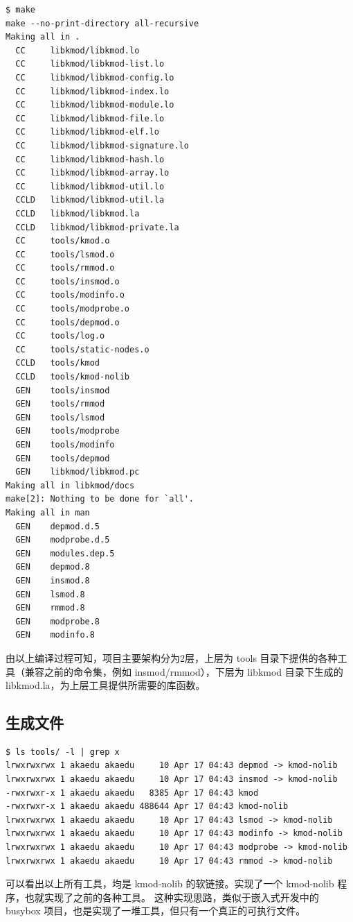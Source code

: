 {\begin{shaded}\begin{verbatim}
$ make
make --no-print-directory all-recursive
Making all in .
  CC     libkmod/libkmod.lo
  CC     libkmod/libkmod-list.lo
  CC     libkmod/libkmod-config.lo
  CC     libkmod/libkmod-index.lo
  CC     libkmod/libkmod-module.lo
  CC     libkmod/libkmod-file.lo
  CC     libkmod/libkmod-elf.lo
  CC     libkmod/libkmod-signature.lo
  CC     libkmod/libkmod-hash.lo
  CC     libkmod/libkmod-array.lo
  CC     libkmod/libkmod-util.lo
  CCLD   libkmod/libkmod-util.la
  CCLD   libkmod/libkmod.la
  CCLD   libkmod/libkmod-private.la
  CC     tools/kmod.o
  CC     tools/lsmod.o
  CC     tools/rmmod.o
  CC     tools/insmod.o
  CC     tools/modinfo.o
  CC     tools/modprobe.o
  CC     tools/depmod.o
  CC     tools/log.o
  CC     tools/static-nodes.o
  CCLD   tools/kmod
  CCLD   tools/kmod-nolib
  GEN    tools/insmod
  GEN    tools/rmmod
  GEN    tools/lsmod
  GEN    tools/modprobe
  GEN    tools/modinfo
  GEN    tools/depmod
  GEN    libkmod/libkmod.pc
Making all in libkmod/docs
make[2]: Nothing to be done for `all'.
Making all in man
  GEN    depmod.d.5
  GEN    modprobe.d.5
  GEN    modules.dep.5
  GEN    depmod.8
  GEN    insmod.8
  GEN    lsmod.8
  GEN    rmmod.8
  GEN    modprobe.8
  GEN    modinfo.8
\end{verbatim}\end{shaded}}
由以上编译过程可知，项目主要架构分为2层，上层为 tools
目录下提供的各种工具（兼容之前的命令集，例如 insmod/rmmod），下层为 libkmod
目录下生成的 libkmod.la，为上层工具提供所需要的库函数。

\subsection{生成文件}

{\begin{shaded}\begin{verbatim}
$ ls tools/ -l | grep x
lrwxrwxrwx 1 akaedu akaedu     10 Apr 17 04:43 depmod -> kmod-nolib
lrwxrwxrwx 1 akaedu akaedu     10 Apr 17 04:43 insmod -> kmod-nolib
-rwxrwxr-x 1 akaedu akaedu   8385 Apr 17 04:43 kmod
-rwxrwxr-x 1 akaedu akaedu 488644 Apr 17 04:43 kmod-nolib
lrwxrwxrwx 1 akaedu akaedu     10 Apr 17 04:43 lsmod -> kmod-nolib
lrwxrwxrwx 1 akaedu akaedu     10 Apr 17 04:43 modinfo -> kmod-nolib
lrwxrwxrwx 1 akaedu akaedu     10 Apr 17 04:43 modprobe -> kmod-nolib
lrwxrwxrwx 1 akaedu akaedu     10 Apr 17 04:43 rmmod -> kmod-nolib
\end{verbatim}\end{shaded}}
可以看出以上所有工具，均是 kmod-nolib 的软链接。实现了一个 kmod-nolib
程序，也就实现了之前的各种工具。 这种实现思路，类似于嵌入式开发中的
busybox 项目，也是实现了一堆工具，但只有一个真正的可执行文件。

